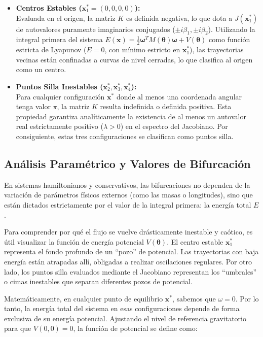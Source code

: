 \documentclass[13pt]{extarticle}
\begin{document}
\begin{itemize}
    \item \textbf{Centros Estables ($\mathbf{x}^*_1 = (0, 0, 0, 0)$):} \\
    Evaluada en el origen, la matriz $K$ es definida negativa, lo que dota a $J(\mathbf{x}^*_1)$ de autovalores puramente imaginarios conjugados ($\pm i\beta_1, \pm i\beta_2$). Utilizando la integral primera del sistema $E(\mathbf{x}) = \frac{1}{2}\boldsymbol{\omega}^T M(\boldsymbol{\theta}) \boldsymbol{\omega} + V(\boldsymbol{\theta})$ como función estricta de Lyapunov ($\dot{E} = 0$, con mínimo estricto en $\mathbf{x}^*_1$), las trayectorias vecinas están confinadas a curvas de nivel cerradas, lo que clasifica al origen como un centro.

    \item \textbf{Puntos Silla Inestables ($\mathbf{x}^*_2, \mathbf{x}^*_3, \mathbf{x}^*_4$):} \\
    Para cualquier configuración $\mathbf{x}^*$ donde al menos una coordenada angular tenga valor $\pi$, la matriz $K$ resulta indefinida o definida positiva. Esta propiedad garantiza analíticamente la existencia de al menos un autovalor real estrictamente positivo ($\lambda > 0$) en el espectro del Jacobiano. Por consiguiente, estas tres configuraciones se clasifican como puntos silla.
\end{itemize}

\subsection{Análisis Paramétrico y Valores de Bifurcación}

En sistemas hamiltonianos y conservativos, las bifurcaciones no dependen de la variación de parámetros físicos externos (como las masas o longitudes), sino que están dictados estrictamente por el valor de la integral primera: la energía total $E$.

Para comprender por qué el flujo se vuelve drásticamente inestable y caótico, es útil visualizar la función de energía potencial $V(\boldsymbol{\theta})$. El centro estable $\mathbf{x}^*_1$ representa el fondo profundo de un ``pozo'' de potencial. Las trayectorias con baja energía están atrapadas allí, obligadas a realizar oscilaciones regulares. Por otro lado, los puntos silla evaluados mediante el Jacobiano representan los ``umbrales'' o cimas inestables que separan diferentes pozos de potencial.

Matemáticamente, en cualquier punto de equilibrio $\mathbf{x}^*$, sabemos que $\omega = 0$. Por lo tanto, la energía total del sistema en esas configuraciones depende de forma exclusiva de su energía potencial. Ajustando el nivel de referencia gravitatorio para que $V(0,0) = 0$, la función de potencial se define como:
\end{document}
